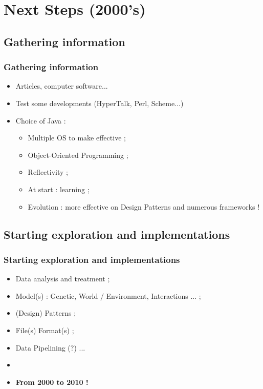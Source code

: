 \documentclass{beamer}
\begin{document}
\def\titleSectionSecondPart{Next Steps (2000's)}
\section{\titleSectionSecondPart }
\def\titleSubSectionSecondPartOne{ Gathering information }
\subsection{ \titleSubSectionSecondPartOne }
\begin{frame}
	\frametitle{ \titleSubSectionSecondPartOne }
	\begin{itemize}
		\item Articles, computer software...
		\item Test some developments (HyperTalk, Perl, Scheme...)
		\item Choice of Java : 
		\begin{itemize}
			\item Multiple OS to make effective ; 
			\item Object-Oriented Programming ; 
			\item Reflectivity ; 
			\item At start : learning ;
			\item Evolution : more effective on Design Patterns and numerous frameworks !
		\end{itemize}
	\end{itemize}
\end{frame}

\def\titleSubSectionSecondPartTwo{ Starting exploration and implementations }
\subsection{ \titleSubSectionSecondPartTwo }
\begin{frame}
	\frametitle{ \titleSubSectionSecondPartTwo }
	\begin{itemize}
		\item Data analysis and treatment ; 
		\item Model(s) : Genetic, World / Environment, Interactions ... ; 
		\item (Design) Patterns ; 
		\item File(s) Format(s) ; 
		\item Data Pipelining (?) ...
		\item[] 
		\item \textbf{From 2000 to 2010 !} 
	\end{itemize}
\end{frame}
\end{document}
